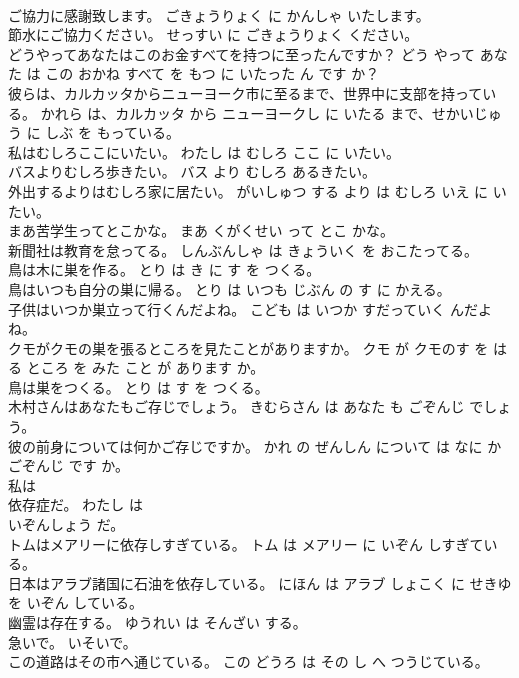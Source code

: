 \documentclass[8pt]{extreport}
\begin{document}
\begin{CJK}{UTF8}{min}
\\	ご協力に感謝致します。	ごきょうりょく に かんしゃ いたします。	
\\	節水にご協力ください。	せっすい に ごきょうりょく ください。	
\\	どうやってあなたはこのお金すべてを持つに至ったんですか？	どう やって あなた は この おかね すべて を もつ に いたった ん です か？	
\\	彼らは、カルカッタからニューヨーク市に至るまで、世界中に支部を持っている。	かれら は、カルカッタ から ニューヨークし に いたる まで、せかいじゅう に しぶ を もっている。	
\\	私はむしろここにいたい。	わたし は むしろ ここ に いたい。	
\\	バスよりむしろ歩きたい。	バス より むしろ あるきたい。	
\\	外出するよりはむしろ家に居たい。	がいしゅつ する より は むしろ いえ に いたい。	
\\	まあ苦学生ってとこかな。	まあ くがくせい って とこ かな。	
\\	新聞社は教育を怠ってる。	しんぶんしゃ は きょういく を おこたってる。	
\\	鳥は木に巣を作る。	とり は き に す を つくる。	
\\	鳥はいつも自分の巣に帰る。	とり は いつも じぶん の す に かえる。	
\\	子供はいつか巣立って行くんだよね。	こども は いつか すだっていく んだよね。	
\\	クモがクモの巣を張るところを見たことがありますか。	クモ が クモのす を はる ところ を みた こと が あります か。	
\\	鳥は巣をつくる。	とり は す を つくる。	
\\	木村さんはあなたもご存じでしょう。	きむらさん は あなた も ごぞんじ でしょう。	
\\	彼の前身については何かご存じですか。	かれ の ぜんしん について は なに か ごぞんじ です か。	
\\	私は
\\	依存症だ。	わたし は 
\\	いぞんしょう だ。	
\\	トムはメアリーに依存しすぎている。	トム は メアリー に いぞん しすぎている。	
\\	日本はアラブ諸国に石油を依存している。	にほん は アラブ しょこく に せきゆ を いぞん している。	
\\	幽霊は存在する。	ゆうれい は そんざい する。	
\\	急いで。	いそいで。	
\\	この道路はその市へ通じている。	この どうろ は その し へ つうじている。	

\end{CJK}
\end{document}
